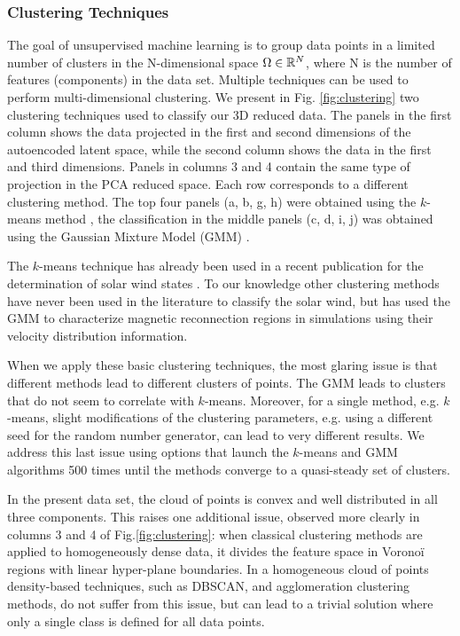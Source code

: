 \subsubsection{Clustering Techniques}
\label{sec:clustering}
The goal of unsupervised machine learning is to group data points in a limited number of clusters in the N-dimensional space $\Omega\in\Bbb R^N$, where N is the number of features (components) in the data set. Multiple techniques can be used to perform multi-dimensional clustering. We present in Fig. \ref{fig:clustering} two clustering techniques used to classify our 3D reduced data. The panels in the first column shows the data projected in the first and second dimensions of the autoencoded latent space, while the second column shows the data in the first and third dimensions. Panels in columns 3 and 4 contain the same type of projection in the PCA reduced space. Each row corresponds to a different clustering method. The top four panels (a, b, g, h) were obtained using the $k$-means method \citep{1056489}, the classification in the middle panels (c, d, i, j) was obtained using the Gaussian Mixture Model (GMM) \citep{bishop2006machine}.

The $k$-means technique has already been used in a recent publication for the determination of solar wind states \citep{Roberts2020}. To our knowledge other clustering methods have never been used in the literature to classify the solar wind, but \citep{Dupuis2020} has used the GMM to characterize magnetic reconnection regions in simulations using their velocity distribution information.

When we apply these basic clustering techniques, the most glaring issue is that different methods lead to different clusters of points. The GMM leads to clusters that do not seem to correlate with $k$-means. Moreover, for a single method, e.g. $k$-means, slight modifications of the clustering parameters, e.g. using a different seed for the random number generator, can lead to very different results. We address this last issue using options that launch the $k$-means and GMM algorithms 500 times until the methods converge to a quasi-steady set of clusters.

In the present data set, the cloud of points is convex and well distributed in all three components. This raises one additional issue, observed more clearly in columns 3 and 4 of Fig.\ref{fig:clustering}: when classical clustering methods are applied to homogeneously dense data, it divides the feature space in Vorono\"i regions with linear hyper-plane boundaries. In a homogeneous cloud of points density-based techniques, such as DBSCAN\citep{ester1996density}, and agglomeration clustering methods, do not suffer from this issue, but can lead to a trivial solution where only a single class is defined for all data points.

